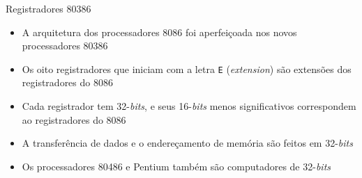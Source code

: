 \begin{frame}[fragile]{Registradores 80386}

    \begin{itemize}
        \item A arquitetura dos processadores 8086 foi aperfeiçoada nos novos processadores 80386

        \item Os oito registradores que iniciam com a letra \texttt{E} (\textit{extension}) são 
            extensões dos registradores do 8086

        \item Cada registrador tem 32-\textit{bits}, e seus 16-\textit{bits} menos significativos
            correspondem ao registradores do 8086

        \item A transferência de dados e o endereçamento de memória são feitos em 32-\textit{bits}

        \item Os processadores 80486 e Pentium também são computadores de 32-\textit{bits}
    \end{itemize}

\end{frame}

